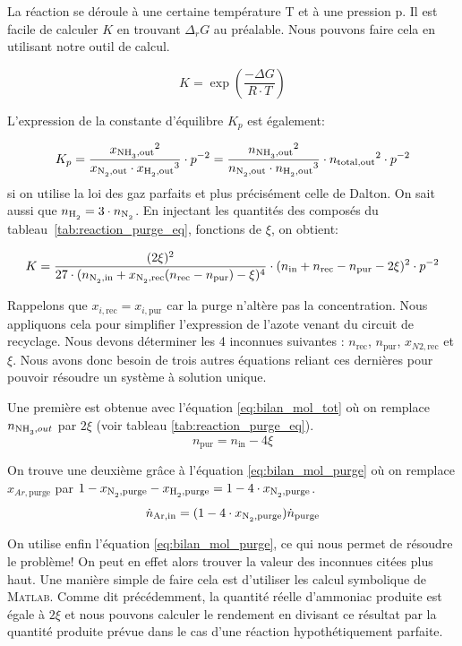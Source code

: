 La réaction se déroule à une certaine température T et à une pression p. 
Il est facile de calculer $K$ en trouvant $\Delta_r G$ au préalable. 
Nous pouvons faire cela en utilisant notre outil de calcul.

\[
K=\exp{\left(\frac{-\Delta G}{R \cdot T}\right)}\]

L'expression de la constante d'équilibre $K_p$ est également: 

\[
K_p=\frac{{x_{\ce{NH3},\text{out}}}^2}{x_{\ce{N2},\text{out}} \cdot
	{x_{\ce{H2},\text{out}}}^3} \cdot p^{-2} = 
	\frac{{n_{\ce{NH3},\text{out}}}^2}{n_{\ce{N2},\text{out}} \cdot 
	{n_{\ce{H2},\text{out}}}^3}\cdot {n_{\text{total,out}}}^2\cdot p^{-2}
\]
si on utilise la loi des gaz parfaits et plus précisément celle de Dalton. 
On sait aussi que $n_{\ce{H2}}=3\cdot n_{\ce{N2}}$.
En injectant les quantités des composés du tableau~\ref{tab:reaction_purge_eq},
fonctions de $\xi$, on obtient:

\[ 
K = 
\frac{({2\xi})^2}{27 \cdot ({{n_{\ce{N2},\text{in}}}+x_{\ce{N2},\text{rec}}
(n_{\text{rec}}-n_{\text{pur}})-\xi})^4} \cdot
	({n_{\text{in}}+n_{\text{rec}}-n_{\text{pur}}-2\xi})^2 \cdot p^{-2} 
\]

Rappelons que $x_{i,\text{rec}}=x_{i,\text{pur}}$ car la purge n'altère pas la concentration.
Nous appliquons cela pour simplifier l'expression de l'azote venant du circuit
de recyclage.
Nous devons déterminer les 4 inconnues suivantes : $n_{\text{rec}}$, $n_{\text{pur}}$, 
$x_{N2,\text{rec}}$ et $\xi$.
Nous avons donc besoin de trois autres équations reliant ces dernières pour pouvoir 
résoudre un système à solution unique.

Une première est obtenue avec l'équation \ref{eq:bilan_mol_tot} où on remplace $n_{\ce{NH3},out}$ par
$2 \xi$ (voir tableau \ref{tab:reaction_purge_eq}).
\[n_{\text{pur}}=n_{\text{in}} - 4 \xi \]

On trouve une deuxième grâce à l'équation \ref{eq:bilan_mol_purge} 
où on remplace $x_{Ar,\text{purge}}$ 
par $1-x_{\ce{N2},\text{purge}}-x_{\ce{H2},\text{purge}}=1-4\cdot x_{\ce{N2},\text{purge}}$.
\[ \dot{n}_{\ce{Ar},\text{in}}=(1-4\cdot x_{\ce{N2},\text{purge}}) \dot{n}_{\text{purge}} \]

On utilise enfin l'équation \ref{eq:bilan_mol_purge}, 
ce qui nous permet de résoudre le problème! On peut en effet alors
trouver la valeur des inconnues citées plus haut.
Une manière simple de faire cela est d'utiliser les calcul symbolique de \textsc{Matlab}. 
Comme dit précédemment, la quantité réelle d'ammoniac produite est égale à $2 \xi$ 
et nous pouvons calculer le rendement en divisant ce résultat
par la quantité produite prévue dans le cas d'une réaction hypothétiquement parfaite.


